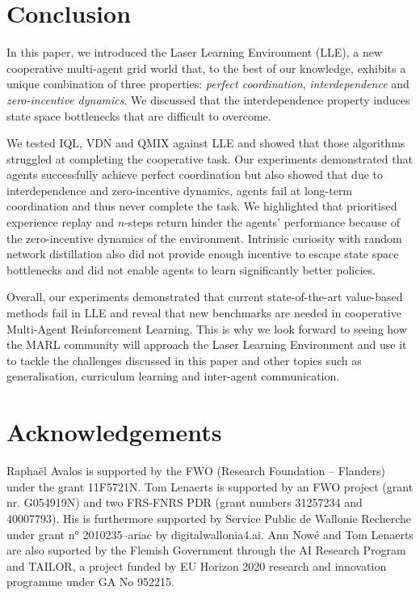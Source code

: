 \section{Conclusion}
In this paper, we introduced the Laser Learning Environment (LLE), a new cooperative multi-agent grid world that, to the best of our knowledge, exhibits a unique combination of three properties: \textit{perfect coordination}, \textit{interdependence} and \textit{zero-incentive dynamics}. We discussed that the interdependence property induces state space bottlenecks that are difficult to overcome.

We tested IQL, VDN and QMIX against LLE and showed that those algorithms struggled at completing the cooperative task. Our experiments demonstrated that agents successfully achieve perfect coordination but also showed that due to interdependence and zero-incentive dynamics, agents fail at long-term coordination and thus never complete the task. We highlighted that prioritised experience replay and $n$-steps return hinder the agents' performance because of the zero-incentive dynamics of the environment. Intrinsic curiosity with random network distillation also did not provide enough incentive to escape state space bottlenecks and did not enable agents to learn significantly better policies.

Overall, our experiments demonstrated that current state-of-the-art value-based methods fail in LLE and reveal that new benchmarks are needed in cooperative Multi-Agent Reinforcement Learning. This is why we look forward to seeing how the MARL community will approach the Laser Learning Environment and use it to tackle the challenges discussed in this paper and other topics such as generalisation, curriculum learning and inter-agent communication.


\section*{Acknowledgements}
Raphaël Avalos is supported by the FWO (Research Foundation – Flanders) under the grant 11F5721N. Tom Lenaerts is supported by an FWO project (grant nr. G054919N) and two FRS-FNRS PDR (grant numbers 31257234 and 40007793). His is furthermore supported by Service Public de Wallonie Recherche under grant n° 2010235–ariac by digitalwallonia4.ai. Ann Nowé and Tom Lenaerts are also suported by the Flemish Government through the AI Research Program and TAILOR, a project funded by EU Horizon 2020 research and innovation programme under GA No 952215.